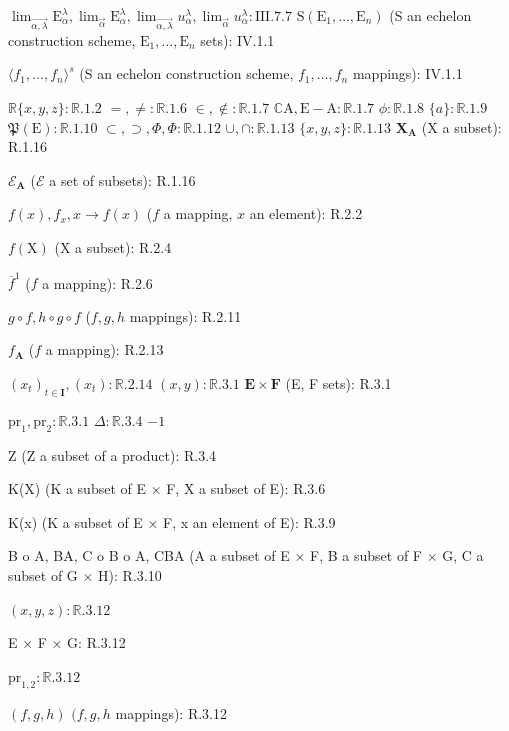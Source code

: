 \(\lim_{\overrightarrow{\alpha,\lambda}} \mathrm{E}_{\alpha}^{\lambda}, \lim_{\overrightarrow{\alpha}} \mathrm{E}_{\alpha}^{\lambda}, \lim_{\overrightarrow{\alpha,\lambda}} u_{\alpha}^{\lambda}, \lim_{\overrightarrow{\alpha}} u_{\alpha}^{\lambda}: \text{III.7.7}\) \(\mathrm{S}(\mathrm{E}_1, \ldots, \mathrm{E}_n)\) (S an echelon construction scheme, \(\mathrm{E}_1, \ldots, \mathrm{E}_n\) sets): IV.1.1

\(\langle f_1, \ldots, f_n \rangle^s\) (S an echelon construction scheme, \(f_1, \ldots, f_n\) mappings): IV.1.1

\(\mathbb{R}\{x, y, z\} : \mathbb{R}.1.2\) \(= , \neq : \mathbb{R}.1.6\) \(\in , \notin : \mathbb{R}.1.7\) \(\mathbb{C}\mathrm{A}, \mathrm{E} - \mathrm{A}: \mathbb{R}.1.7\) \(\phi : \mathbb{R}.1.8\) \(\{a\} : \mathbb{R}.1.9\) \(\mathfrak{P}(\mathrm{E}) : \mathbb{R}.1.10\) \(\subset, \supset, \Phi, \Phi: \mathbb{R}.1.12\) \(\cup, \cap : \mathbb{R}.1.13\) \(\{x, y, z\} : \mathbb{R}.1.13\) \(\mathbf{X}_{\mathbf{A}}\) (X a subset): R.1.16

\(\mathcal{E}_{\mathbf{A}}\) (\(\mathcal{E}\) a set of subsets): R.1.16

\(f(x), f_x, x \to f(x)\) (\(f\) a mapping, \(x\) an element): R.2.2

\(f(\mathrm{X})\) (X a subset): R.2.4

\(\overline{f}^{1}\) (\(f\) a mapping): R.2.6

\(g \circ f, h \circ g \circ f\) (\(f, g, h\) mappings): R.2.11

\(f_{\mathbf{A}}\) (\(f\) a mapping): R.2.13

\((x_t)_{t \in \mathbf{I}}, (x_t) : \mathbb{R}.2.14\) \((x, y) : \mathbb{R}.3.1\) \(\mathbf{E} \times \mathbf{F}\) (E, F sets): R.3.1

\(\mathrm{pr}_1, \mathrm{pr}_2: \mathbb{R}.3.1\) \(\Delta : \mathbb{R}.3.4\) \(-1\)

Z (Z a subset of a product): R.3.4

K(X) (K a subset of E × F, X a subset of E): R.3.6

K(x) (K a subset of E × F, x an element of E): R.3.9

B o A, BA, C o B o A, CBA (A a subset of E × F, B a subset of F × G, C a subset of G × H): R.3.10

\((x, y, z) : \mathbb{R}.3.12\)

E × F × G: R.3.12

\(\mathrm{pr}_{1,2}: \mathbb{R}.3.12\)

\((f,g,h)\) \((f,g,h\) mappings): R.3.12

